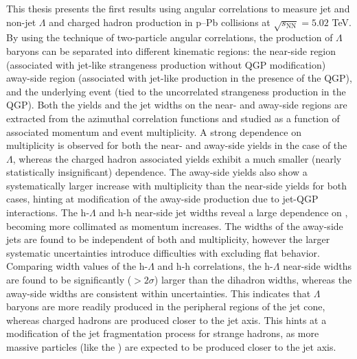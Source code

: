 This thesis presents the first results using angular correlations to measure jet and non-jet $\Lambda$ and charged hadron production in p--Pb collisions at $\sqrt{s_{\text{NN}}} = 5.02$ TeV. By using the technique of two-particle angular correlations, the production of $\Lambda$ baryons can be separated into different kinematic regions: the near-side region (associated with jet-like strangeness production without QGP modification) away-side region (associated with jet-like production in the presence of the QGP), and the underlying event (tied to the uncorrelated strangeness production in the QGP). Both the yields and the jet widths on the near- and away-side regions are extracted from the azimuthal correlation functions and studied as a function of associated momentum and event multiplicity. A strong dependence on multiplicity is observed for both the near- and away-side yields in the case of the $\Lambda$, whereas the charged hadron associated yields exhibit a much smaller (nearly statistically insignificant) dependence. The away-side yields also show a systematically larger increase with multiplicity than the near-side yields for both cases, hinting at modification of the away-side production due to jet-QGP interactions. The h-$\Lambda$ and h-h near-side jet widths reveal a large dependence on \pt, becoming more collimated as momentum increases. The widths of the away-side jets are found to be independent of both \pt and multiplicity, however the larger systematic uncertainties introduce difficulties with excluding flat behavior. Comparing width values of the h-$\Lambda$ and h-h correlations, the h-$\Lambda$ near-side widths are found to be significantly ($> 2\sigma$) larger than the dihadron widths, whereas the away-side widths are consistent within uncertainties. This indicates that $\Lambda$ baryons are more readily produced in the peripheral regions of the jet cone, whereas charged hadrons are produced closer to the jet axis. This hints at a modification of the jet fragmentation process for strange hadrons, as more massive particles (like the \lmb) are expected to be produced closer to the jet axis.

